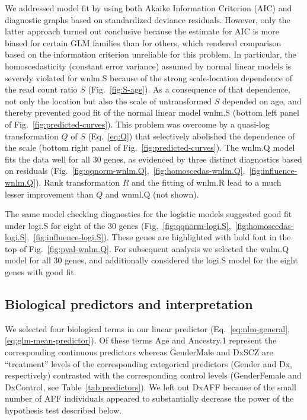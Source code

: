 \documentclass[12pt,letterpaper]{article}
\begin{document}
We addressed model fit by using both Akaike Information Criterion (AIC) and
diagnostic graphs based on standardized deviance residuals.  However, only the
latter approach turned out conclusive because the estimate for AIC is more
biased for certain GLM families than for others, which rendered comparison
based on the information criterion unreliable for this problem.  In
particular, the homoscedasticity (constant error variance) assumed by normal
linear models is severely violated for wnlm.S because of the strong
scale-location dependence of the read count ratio \(S\)
(Fig.~\ref{fig:S-age}).  As a consequence of that dependence, not only
the location but also the scale of untransformed \(S\) depended on age, and
thereby prevented good fit of the normal linear model wnlm.S (bottom left
panel of Fig.~\ref{fig:predicted-curves}).  This problem was overcome by a
quasi-log transformation \(Q\) of \(S\) (Eq.~\ref{eq:Q}) that selectively
abolished the dependence of the scale (bottom right panel of
Fig.~\ref{fig:predicted-curves}).  The wnlm.Q model fits the data well for all
30 genes, as evidenced by three distinct diagnostics based on residuals
(Fig.~\ref{fig:qqnorm-wnlm.Q},~\ref{fig:homoscedas-wnlm.Q},~\ref{fig:influence-wnlm.Q}).
Rank transformation \(R\) and the fitting of wnlm.R lead to a much lesser
improvement than \(Q\) and wnml.Q (not shown).

The same model checking diagnostics for the logistic models suggested good
fit under logi.S for eight of the 30 genes
(Fig.~\ref{fig:qqnorm-logi.S},~\ref{fig:homoscedas-logi.S},~\ref{fig:influence-logi.S}).
These genes are highlighted with bold font in the top of Fig.~\ref{fig:pval-wnlm.Q}.
For subsequent analysis we selected  the wnlm.Q model for all 30 genes, and
additionally considered the logi.S model for the eight
genes with good fit.

\subsection{Biological predictors and interpretation}

We selected four biological terms in our linear predictor
(Eq.~\ref{eq:nlm-general}, \ref{eq:glm-mean-predictor}).  Of these terms Age
and Ancestry.1 represent the corresponding continuous predictors whereas
GenderMale and DxSCZ are “treatment” levels of the corresponding categorical
predictors (Gender and Dx, respectively) contrasted with the corresponding
control levels (GenderFemale and DxControl, see Table~\ref{tab:predictors}).
We left out DxAFF because of the small number of AFF individuals appeared to
substantially decrease the power of the hypothesis test described below.
\end{document}
